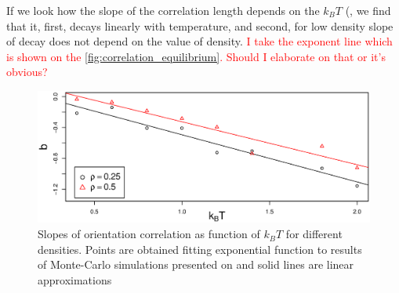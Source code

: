 If we look how the slope of the correlation length depends on the $k_BT$ (, we find that it, first, decays linearly with temperature, and second, for low density slope of decay does not depend on the value of density. \textcolor{red}{I take the exponent line which is shown on the \ref{fig:correlation_equilibrium}. Should I elaborate on that or it's obvious?}

\begin{figure}[t]
	\centering
	\includegraphics[width=.7\textwidth]{Images/correlations_slopes}
	\captionsetup{justification=centering, width=0.9\columnwidth}
	\caption{Slopes of orientation correlation as function of $k_BT$ for different densities. Points are obtained fitting exponential function to results of Monte-Carlo simulations presented on   and solid lines are linear approximations}
	\label{fig:correlation_slopes}
\end{figure}